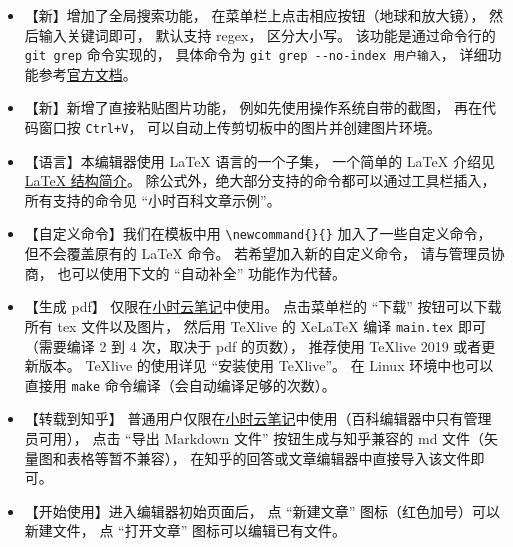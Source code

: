 \begin{itemize}
\item 【新】增加了全局搜索功能， 在菜单栏上点击相应按钮（地球和放大镜）， 然后输入关键词即可， 默认支持 regex， 区分大小写。 该功能是通过命令行的 \verb|git grep| 命令实现的， 具体命令为 \verb|git grep --no-index 用户输入|， 详细功能参考\href{https://git-scm.com/docs/git-grep}{官方文档}。
\item 【新】新增了直接粘贴图片功能， 例如先使用操作系统自带的截图， 再在代码窗口按 \verb|Ctrl+V|， 可以自动上传剪切板中的图片并创建图片环境。
\item 【语言】本编辑器使用 LaTeX 语言的一个子集， 一个简单的 LaTeX 介绍见 \href{https://wuli.wiki/online/latxIn.html}{LaTeX 结构简介}。 除公式外，绝大部分支持的命令都可以通过工具栏插入， 所有支持的命令见 “小时百科文章示例”。
\item 【自定义命令】我们在模板中用 \verb|\newcommand{}{}| 加入了一些自定义命令， 但不会覆盖原有的 LaTeX 命令。 若希望加入新的自定义命令， 请与管理员协商， 也可以使用下文的 “自动补全” 功能作为代替。
\item 【生成 pdf】 仅限在\href{http://wuli.wiki/note/}{小时云笔记}中使用。 点击菜单栏的 “下载” 按钮可以下载所有 tex 文件以及图片， 然后用 TeXlive 的 XeLaTeX 编译 \verb|main.tex| 即可（需要编译 2 到 4 次，取决于 pdf 的页数）， 推荐使用 TeXlive 2019 或者更新版本。 TeXlive 的使用详见 “安装使用 TeXlive”。 在 Linux 环境中也可以直接用 \verb|make| 命令编译（会自动编译足够的次数）。
\item 【转载到知乎】 普通用户仅限在\href{http://wuli.wiki/note/}{小时云笔记}中使用（百科编辑器中只有管理员可用）， 点击 “导出 Markdown 文件” 按钮生成与知乎兼容的 md 文件（矢量图和表格等暂不兼容）， 在知乎的回答或文章编辑器中直接导入该文件即可。
\item 【开始使用】进入编辑器初始页面后， 点 “新建文章” 图标（红色加号）可以新建文件， 点 “打开文章” 图标可以编辑已有文件。

\end{itemize}

